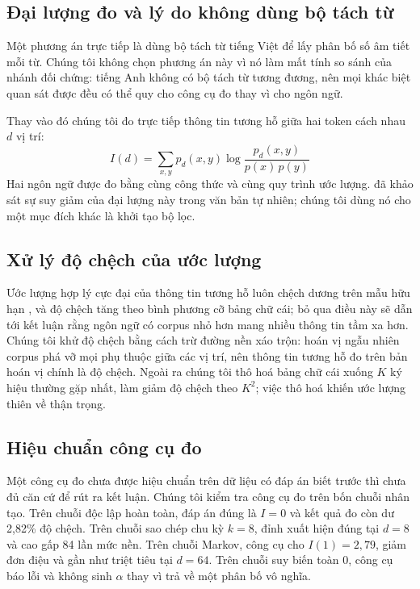 \documentclass[11pt]{article}
\begin{document}
\subsection{Đại lượng đo và lý do không dùng bộ tách từ}

Một phương án trực tiếp là dùng bộ tách từ tiếng Việt để lấy phân bố số âm tiết
mỗi từ. Chúng tôi không chọn phương án này vì nó làm mất tính so sánh của nhánh
đối chứng: tiếng Anh không có bộ tách từ tương đương, nên mọi khác biệt quan sát
được đều có thể quy cho công cụ đo thay vì cho ngôn ngữ.

Thay vào đó chúng tôi đo trực tiếp thông tin tương hỗ giữa hai token cách nhau
$d$ vị trí:
\begin{equation}
I(d) = \sum_{x,y} p_d(x,y) \log \frac{p_d(x,y)}{p(x)\,p(y)}
\label{eq:mi}
\end{equation}
Hai ngôn ngữ được đo bằng cùng công thức và cùng quy trình ước lượng.
\citet{lin2017critical} đã khảo sát sự suy giảm của đại lượng này trong văn bản
tự nhiên; chúng tôi dùng nó cho một mục đích khác là khởi tạo bộ lọc.

\subsection{Xử lý độ chệch của ước lượng}

Ước lượng hợp lý cực đại của thông tin tương hỗ luôn chệch dương trên mẫu hữu
hạn \citep{paninski2003estimation}, và độ chệch tăng theo bình phương cỡ bảng chữ cái; bỏ qua điều này sẽ dẫn
tới kết luận rằng ngôn ngữ có corpus nhỏ hơn mang nhiều thông tin tầm xa hơn.
Chúng tôi khử độ chệch bằng cách trừ đường nền xáo trộn: hoán vị ngẫu nhiên corpus
phá vỡ mọi phụ thuộc giữa các vị trí, nên thông tin tương hỗ đo trên bản hoán vị
chính là độ chệch. Ngoài ra chúng tôi thô hoá bảng chữ cái xuống $K$ ký hiệu thường gặp
nhất, làm giảm độ chệch theo $K^2$; việc thô hoá khiến ước lượng thiên về thận trọng.

\subsection{Hiệu chuẩn công cụ đo}

Một công cụ đo chưa được hiệu chuẩn trên dữ liệu có đáp án biết trước thì chưa
đủ căn cứ để rút ra kết luận. Chúng tôi kiểm tra công cụ đo trên bốn chuỗi nhân
tạo. Trên chuỗi độc lập hoàn toàn, đáp án đúng là $I = 0$ và kết quả đo còn dư
2,82\% độ chệch. Trên chuỗi sao chép chu kỳ $k = 8$, đỉnh xuất hiện đúng tại
$d = 8$ và cao gấp 84 lần mức nền. Trên chuỗi Markov, công cụ cho $I(1) = 2{,}79$,
giảm đơn điệu và gần như triệt tiêu tại $d = 64$. Trên chuỗi suy biến toàn 0,
công cụ báo lỗi và không sinh $\alpha$ thay vì trả về một phân bố vô nghĩa.
\end{document}
